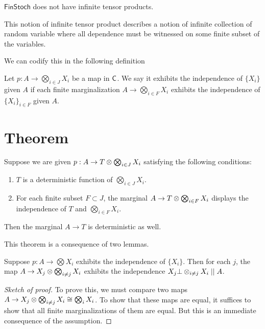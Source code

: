 \documentclass[11pt]{article}
\renewcommand{\sf}{\mathsf}
\begin{document}
\begin{example}
	\label{infprods_finstoch}
	$\sf{FinStoch}$ does not have infinite tensor products.
\end{example}

This notion of infinite tensor product describes a notion of infinite collection of random variable where all dependence must be witnessed on some finite subset of the variables.

We can codify this in the following definition
\begin{definition}
    Let $p: A \to \bigotimes_{i\in J}X_i$ be a map in $\mathsf{C}$.
    We say it exhibits the independence of $\{X_i\}$ given $A$ if each finite marginalization $A \to \bigotimes_{i \in F}X_i$ exhibits the independence of $\{X_i\}_{i \in F}$ given $A$.
\end{definition}

\section{Theorem}
\begin{theorem}
    \label{thm:kolmog}
    Suppose we are given $p: A \to T \otimes \bigotimes_{i \in J} X_i$ satisfying the following conditions:
    \begin{enumerate}
        \item $T$ is a deterministic function of $\bigotimes_{i \in J} X_i$.
        \item For each finite subset $F \subset J$, the marginal $A \to T \otimes \bigotimes_{i \in F}X_i$ displays the independence of $T$ and $\bigotimes_{i \in F} X_i$.
    \end{enumerate}
    Then the marginal $A \to T$ is deterministic as well.
\end{theorem}

This theorem is a consequence of two lemmas.
\begin{lemma}
    Suppose $p: A \to \bigotimes X_i$ exhibits the independence of $\{X_i\}$.
    Then for each $j$, the map $A \to X_j \otimes \bigotimes_{i \neq j}X_i$ exhibits the independence $X_j \bot \otimes_{i\neq j} X_i \mid \mid A$.
\end{lemma}
\begin{proof}[Sketch of proof]
    To prove this, we must compare two maps $A \to X_j \otimes \bigotimes_{i\neq j} X_i \cong \bigotimes_i X_i$.
    To show that these maps are equal, it suffices to show that all finite marginalizations of them are equal.
    But this is an immediate consequence of the assumption.
\end{proof}
\end{document}
